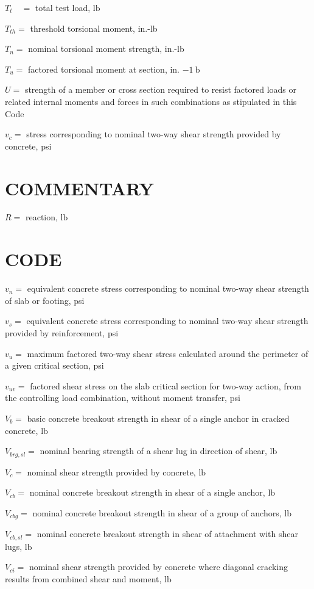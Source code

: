 \documentclass[10pt]{article}
\begin{document}
$T_{t} \quad=$ total test load, $\mathrm{lb}$

$T_{t h}=$ threshold torsional moment, in.-lb

$T_{n}=$ nominal torsional moment strength, in.-lb

$T_{u}=$ factored torsional moment at section, in. $-1 \mathrm{~b}$

$U=$ strength of a member or cross section required to resist factored loads or related internal moments and forces in such combinations as stipulated in this Code

$v_{c}=$ stress corresponding to nominal two-way shear strength provided by concrete, psi

\section*{COMMENTARY}
$R=$ reaction, $\mathrm{lb}$

\section*{CODE}
$v_{n}=$ equivalent concrete stress corresponding to nominal two-way shear strength of slab or footing, psi

$v_{s}=$ equivalent concrete stress corresponding to nominal two-way shear strength provided by reinforcement, psi

$v_{u}=$ maximum factored two-way shear stress calculated around the perimeter of a given critical section, psi

$v_{u v}=$ factored shear stress on the slab critical section for two-way action, from the controlling load combination, without moment transfer, psi

$V_{b}=$ basic concrete breakout strength in shear of a single anchor in cracked concrete, $\mathrm{lb}$

$V_{b r g, s l}=$ nominal bearing strength of a shear lug in direction of shear, $\mathrm{lb}$

$V_{c}=$ nominal shear strength provided by concrete, $\mathrm{lb}$

$V_{c b}=$ nominal concrete breakout strength in shear of a single anchor, $\mathrm{lb}$

$V_{c b g}=$ nominal concrete breakout strength in shear of a group of anchors, $\mathrm{lb}$

$V_{c b, s l}=$ nominal concrete breakout strength in shear of attachment with shear lugs, $\mathrm{lb}$

$V_{c i}=$ nominal shear strength provided by concrete where diagonal cracking results from combined shear and moment, $\mathrm{lb}$
\end{document}
